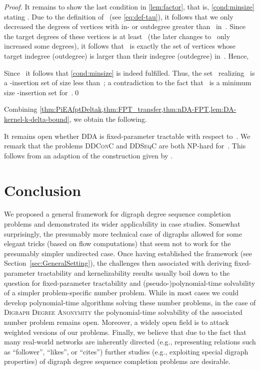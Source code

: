 \documentclass[a4paper,11pt]{article}
\theoremstyle{remark}
\theoremstyle{plain}
\newtheorem{corollary}[theorem]{Corollary}
\theoremstyle{definition}
\newcommand{\DDCC}{\textsc{DDConC}\xspace}
\newcommand{\DDSC}{\textsc{DDSeqC}\xspace}
\newcommand{\DAlong}{\textsc{Digraph Degree Anonymity}\xspace}
\newcommand{\DA}{\textsc{DDA}\xspace}
\begin{document}
\begin{proof}
	It remains to show the last condition in \cref{lem:factor}, that is, \cref{cond:minsize} stating .
	Due to the definition of~ (see \cref{eq:def-tau}), it follows that we only decreased the degrees of vertices with in- or outdegree greater than~ in~.
	Since the target degrees of these vertices is at least~ (the later changes to~ only increased some degrees), it follows that~ is exactly the set of vertices whose target indegree (outdegree) is larger than their indegree (outdegree) in~. 
	Hence, 
	
	Since~ it follows that \cref{cond:minsize} is indeed fulfilled.
	Thus, the set~ realizing~ is a -insertion set of size less than~; a contradiction to the fact that~ is a minimum size -insertion set for~.\qed
\end{proof}

Combining \cref{thm:PiEAfptDeltak,thm:FPT_transfer,thm:nDA-FPT,lem:DA-kernel-k-delta-bound}, we obtain the following.


It remains open whether \DA is fixed-parameter tractable with respect to~.
We remark that the problems \DDCC and \DDSC are both NP-hard for~. 
This follows from an adaption of the construction given by \citet[Theorem 3.2]{Mil15}.


\section{Conclusion}
We proposed a general framework for digraph degree sequence completion
problems and demonstrated its wider applicability in case studies. 
Somewhat surprisingly, the presumably more technical case 
of digraphs allowed for some elegant tricks (based on
flow computations) that seem not to work for the 
presumably simpler undirected case. 
Once having established the framework (see Section~\ref{sec:GeneralSetting}), 
the challenges then
associated with deriving fixed-parameter tractability and kernelizability 
results usually boil down to the question for fixed-parameter tractability and (pseudo-)polynomial-time solvability of a simpler
problem-specific number problem. 
While in most cases we could develop polynomial-time algorithms solving these number problems, in the case of \DAlong the polynomial-time solvability of the associated number problem remains open.
Moreover, a widely open field is to attack weighted versions 
of our problems. 
Finally, we believe that due to the fact that many real-world networks 
are inherently directed 
(e.g., representing relations such as ``follower'', ``likes'', or ``cites'')
further studies (e.g., exploiting special digraph properties) 
of digraph degree sequence completion problems are desirable.



\end{document}
